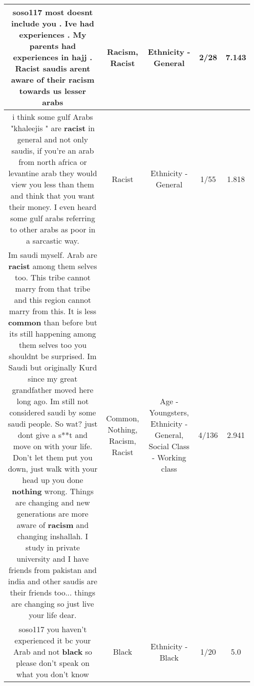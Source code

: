 \documentclass[11pt]{article}
\newlength\mylength
\begin{document}
\begin{center}
\begin{longtable}{|C{.65\mylength}|C{.30\mylength}|C{.12\mylength}|C{.12\mylength}|C{.12\mylength}|}
  \small soso117 most doesnt include you . Ive had experiences . My parents had experiences in hajj . \textbf{Racist} saudis arent aware of their \textbf{racism} towards us lesser arabs\normalsize   & Racism, Racist & Ethnicity - General & 2/28 & 7.143 \\  \hline
  \small i think some gulf Arabs "khaleejis " are \textbf{racist} in general and not only saudis, if you're an arab from north africa or levantine arab they would view you less than them and think that you want their money. I even heard some gulf arabs  referring to other arabs as poor in a sarcastic way.\normalsize   & Racist & Ethnicity - General & 1/55 & 1.818 \\  \hline
  \small Im saudi myself. Arab are \textbf{racist} among them selves too. This tribe cannot marry from that tribe and this region cannot marry from this. It is less \textbf{common} than before but its still happening among them selves too you shouldnt be surprised. Im Saudi but originally Kurd since my great grandfather moved here long ago. Im still not considered saudi by some saudi people. So wat? just dont give a s**t and move on with your life. Don't let them put you down, just walk with your head up you done \textbf{nothing} wrong. Things are changing and new generations are more aware of \textbf{racism} and changing inshallah. I study in private university and I have friends from pakistan and india and other saudis are their friends too... things are changing so just live your life dear.\normalsize   & Common, Nothing, Racism, Racist & Age - Youngsters, Ethnicity - General, Social Class - Working class & 4/136 & 2.941 \\  \hline
  \small soso117 you haven't experienced it bc your Arab and not \textbf{black} so please don't speak on what you don't know\normalsize   & Black & Ethnicity - Black & 1/20 & 5.0 \\  \hline

\end{longtable}
\end{center}
\end{document}
